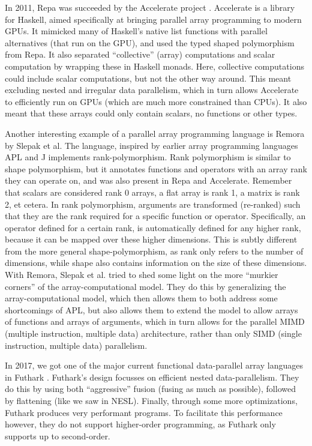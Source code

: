         In 2011, Repa was succeeded by the Accelerate project \cite{chakravarty2011accelerating}.
        Accelerate is a library for Haskell, aimed specifically at bringing parallel array programming to modern GPUs.
        It mimicked many of Haskell's native list functions with parallel alternatives (that run on the GPU), and used the typed shaped polymorphism from Repa.
        It also separated ``collective'' (array) computations and scalar computation by wrapping these in Haskell monads.
        Here, collective computations could include scalar computations, but not the other way around.
        This meant excluding nested and irregular data parallelism, which in turn allows Accelerate to efficiently run on GPUs (which are much more constrained than CPUs).
        It also meant that these arrays could only contain scalars, no functions or other types.
        
        Another interesting example of a parallel array programming language is Remora by Slepak et al. \cite{slepak2014array}
        The language, inspired by earlier array programming languages APL \cite{iverson1962programming} and J implements rank-polymorphism.
        Rank polymorphism is similar to shape polymorphism, but it annotates functions and operators with an array rank they can operate on, and was also present in Repa and Accelerate.
        Remember that scalars are considered rank 0 arrays, a flat array is rank 1, a matrix is rank 2, et cetera.
        In rank polymorphism, arguments are transformed (re-ranked) such that they are the rank required for a specific function or operator.
        Specifically, an operator defined for a certain rank, is automatically defined for any higher rank, because it can be mapped over these higher dimensions.
        This is subtly different from the more general shape-polymorphism, as rank only refers to the number of dimensions, while shape also contains information on the size of these dimensions.
        With Remora, Slepak et al. tried to shed some light on the more ``murkier corners'' of the array-computational model.
        They do this by generalizing the array-computational model, which then allows them to both address some shortcomings of APL, but also allows them to extend the model to allow arrays of functions and arrays of arguments, which in turn allows for the parallel MIMD (multiple instruction, multiple data) architecture, rather than only SIMD (single instruction, multiple data) parallelism.

        In 2017, we got one of the major current functional data-parallel array languages in Futhark \cite{henriksen2017futhark}.
        Futhark's design focusses on efficient nested data-parallelism.
        They do this by using both ``aggressive'' fusion (fusing as much as possible), followed by flattening (like we saw in NESL).
        Finally, through some more optimizations, Futhark produces very performant programs.
        To facilitate this performance however, they do not support higher-order programming, as Futhark only supports up to second-order.

